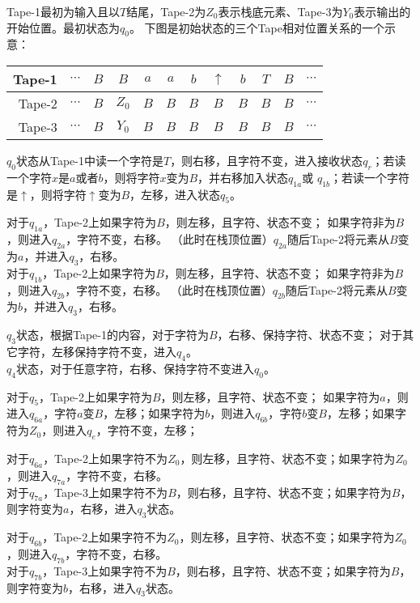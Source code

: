 \begin{solution}
    Tape-1最初为输入且以$T$结尾，Tape-2为$Z_0$表示栈底元素、Tape-3为$Y_0$表示输出的开始位置。最初状态为$q_0$。
    下图是初始状态的三个Tape相对位置关系的一个示意：
    \begin{center}
        \begin{tabular}{r||c|c|c|c|c|c|c|c|c|c|c}\hline
            Tape-1& $\cdots$&$B$&$B$ & $a$& $a$& $b$& $\uparrow$& $b$&$T$&$B$ & $\cdots$ \\\hline
            Tape-2& $\cdots$&$B$&$Z_0$ &$B$ &$B$ &$B$ &$B$ &$B$&$B$&$B$  &$\cdots$\\\hline
            Tape-3& $\cdots$&$B$&$Y_0$ &$B$ &$B$ &$B$ &$B$ &$B$&$B$&$B$  &$\cdots$\\\hline
        \end{tabular}
    \end{center}
    $q_0$状态从Tape-1中读一个字符是$T$，则右移，且字符不变，进入接收状态$q_r$；若读一个字符$x$是$a$或者$b$，则将字符$x$变为$B$，并右移加入状态$q_{1a}$或
    $q_{1b}$；若读一个字符是$\uparrow$，则将字符$\uparrow$变为$B$，左移，进入状态$q_5$。

    对于$q_{1a}$，Tape-2上如果字符为$B$，则左移，且字符、状态不变；
    如果字符非为$B$，则进入$q_{2a}$，字符不变，右移。
    （此时在栈顶位置）$q_{2a}$随后Tape-2将元素从$B$变为$a$，并进入$q_{3}$，右移。\\
    对于$q_{1b}$，Tape-2上如果字符为$B$，则左移，且字符、状态不变；
    如果字符非为$B$，则进入$q_{2b}$，字符不变，右移。
    （此时在栈顶位置）$q_{2b}$随后Tape-2将元素从$B$变为$b$，并进入$q_{3}$，右移。

    $q_{3}$状态，根据Tape-1的内容，对于字符为$B$，右移、保持字符、状态不变；
    对于其它字符，左移保持字符不变，进入$q_{4}$。\\
    $q_{4}$状态，对于任意字符，右移、保持字符不变进入$q_{0}$。

    
    对于$q_5$，Tape-2上如果字符为$B$，则左移，且字符、状态不变；
    如果字符为$a$，则进入$q_{6a}$，字符$a$变$B$，左移；如果字符为$b$，则进入$q_{6b}$，字符$b$变$B$，左移；如果字符为$Z_0$，则进入$q_e$，字符不变，左移；

    对于$q_{6a}$，Tape-2上如果字符不为$Z_0$，则左移，且字符、状态不变；如果字符为$Z_0$，则进入$q_{7a}$，字符不变，右移。\\
    对于$q_{7a}$，Tape-3上如果字符不为$B$，则右移，且字符、状态不变；如果字符为$B$，则字符变为$a$，右移，进入$q_{3}$状态。

    对于$q_{6b}$，Tape-2上如果字符不为$Z_0$，则左移，且字符、状态不变；如果字符为$Z_0$，则进入$q_{7b}$，字符不变，右移。\\
    对于$q_{7b}$，Tape-3上如果字符不为$B$，则右移，且字符、状态不变；如果字符为$B$，则字符变为$b$，右移，进入$q_{3}$状态。
    

\end{solution}
